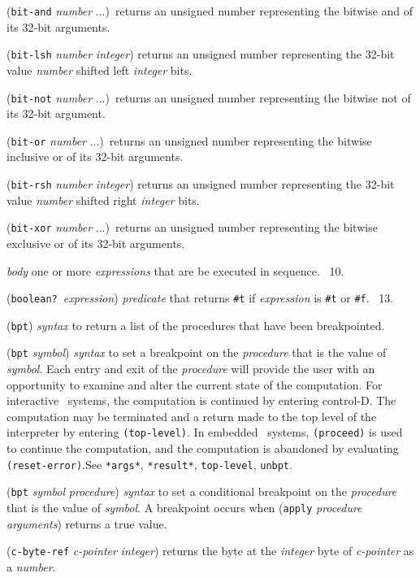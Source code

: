 \documentclass[10pt,twocolumn]{article}
\begin{document}
(\texttt{bit-and} \emph{number} ...)\ returns an unsigned number
representing the bitwise and of its 32-bit arguments.

(\texttt{bit-lsh} \emph{number} \emph{integer}) returns an unsigned
number representing the 32-bit value \emph{number} shifted left
\emph{integer} bits.

(\texttt{bit-not} \emph{number} ...)\ returns an unsigned number
representing the bitwise not of its 32-bit argument.

(\texttt{bit-or} \emph{number} ...)\ returns an unsigned number
representing the bitwise inclusive or of its 32-bit arguments.

(\texttt{bit-rsh} \emph{number} \emph{integer}) returns an unsigned
number representing the 32-bit value \emph{number} shifted right
\emph{integer} bits.

(\texttt{bit-xor} \emph{number} ...)\ returns an unsigned number
representing the bitwise exclusive or of its 32-bit arguments.

\emph{body} one or more \emph{expressions} that are be executed in
sequence. \RRRRRS~10.

(\texttt{boolean?}\ \emph{expression}) \emph{predicate} that returns
\texttt{\#t} if \emph{expression} is \texttt{\#t} or \texttt{\#f}.
\RRRRRS~13.

(\texttt{bpt}) \emph{syntax} to return a list of the procedures that
have been breakpointed.

(\texttt{bpt} \emph{symbol}) \emph{syntax} to set a breakpoint on the
\emph{procedure} that is the value of \emph{symbol}.  Each entry and
exit of the \emph{procedure} will provide the user with an opportunity
to examine and alter the current state of the computation.  For
interactive \StoC\ systems, the computation is continued by entering
control-D.  The computation may be terminated and a return made to the
top level of the interpreter by entering \texttt{(top-level)}.  In
embedded \StoC\ systems, \texttt{(proceed)} is used to continue the
computation, and the computation is abandoned by evaluating
\texttt{(reset-error)}.See \texttt{*args*}, \texttt{*result*},
\texttt{top-level}, \texttt{unbpt}.

(\texttt{bpt} \emph{symbol} \emph{procedure}) \emph{syntax} to set a
conditional breakpoint on the \emph{procedure} that is the value of
\emph{symbol}.  A breakpoint occurs when (\texttt{apply}
\emph{procedure} \emph{arguments}) returns a true value.

(\texttt{c-byte-ref} \emph{c-pointer} \emph{integer}) returns the byte
at the \emph{integer} byte of \emph{c-pointer} as a \emph{number}.
\end{document}
